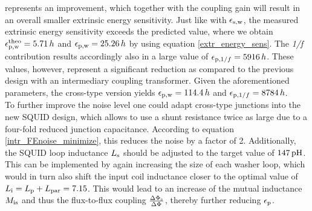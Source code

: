 represents an improvement, which together with the coupling gain will result in an overall smaller extrinsic energy sensitivity. Just like with $\epsilon_{\rm s,w}$, the measured extrinsic energy sensitivity exceeds the predicted value, where we obtain $\epsilon_{\rm p,w}^{\rm theo}=5.71\, h$ and $\epsilon_{\rm p,w}=25.26\, h$ by using equation \ref{extr_energy_sens}. The \textit{1/f} contribution results accordingly also in a large value of $\epsilon_{{\rm p},1/f}=5916\, h$. These values, however, represent a significant reduction as compared to the previous design with an intermediary coupling transformer. Given the aforementioned parameters, the cross-type version yields $\epsilon_{\rm p,w}=114.4\, h$ and $\epsilon_{{\rm p},1/f}=8784\, h$. \\

To further improve the noise level one could adapt cross-type junctions into the new SQUID design, which allows to use a shunt resistance twice as large due to a four-fold reduced junction capacitance. According to equation \ref{intr_FEnoise_minimize}, this reduces the noise by a factor of 2. Additionally, the SQUID loop inductance $L_{\rm s}$ should be adjusted to the target value of $\qty{147}{\pH}$. This can be implemented by again increasing the size of each washer loop, which would in turn also shift the input coil inductance closer to the optimal value of $L_{\rm i}=L_{\rm p}+L_{\rm par}=7.15$. This would lead to an increase of the mutual inductance $M_{\rm is}$ and thus the flux-to-flux coupling $\frac{\Delta\Phi_{\rm s}}{\Delta\Phi_{\rm }}$, thereby further reducing $\epsilon_{\rm p}$.               

